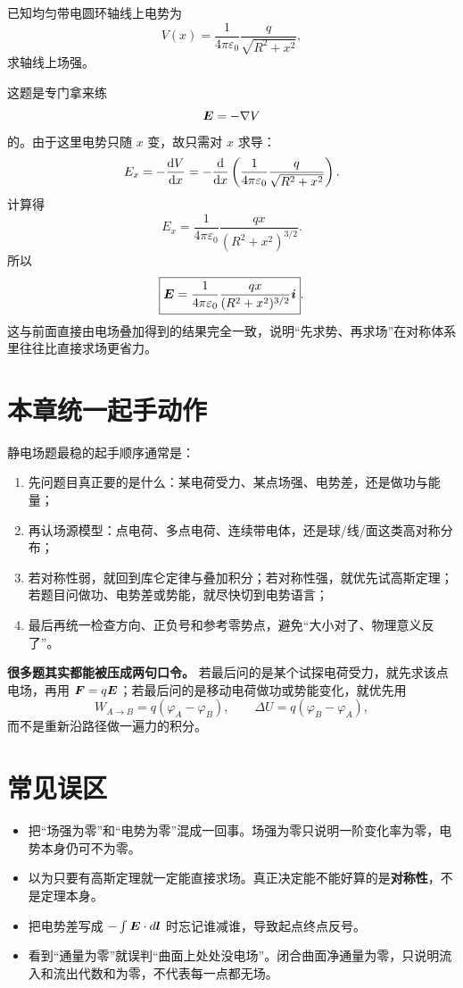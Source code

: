 \documentclass[lang=cn,11pt]{elegantbook}
\begin{document}
\begin{example}[由电势反推圆环轴线上的场强]
已知均匀带电圆环轴线上电势为
\[
V(x)=\frac{1}{4\pi\varepsilon_0}\frac{q}{\sqrt{R^2+x^2}},
\]
求轴线上场强。
\end{example}

\begin{solution}
这题是专门拿来练
\[
\vb*{E}=-\nabla V
\]
的。由于这里电势只随 \(x\) 变，故只需对 \(x\) 求导：
\[
E_x=-\dv{V}{x}
=-\dv{}{x}\left(
\frac{1}{4\pi\varepsilon_0}\frac{q}{\sqrt{R^2+x^2}}
\right).
\]
计算得
\[
E_x=
\frac{1}{4\pi\varepsilon_0}
\frac{qx}{(R^2+x^2)^{3/2}}.
\]
所以
\[
\boxed{
\vb*{E}=
\frac{1}{4\pi\varepsilon_0}
\frac{qx}{(R^2+x^2)^{3/2}}\vb*{i}
}.
\]
这与前面直接由电场叠加得到的结果完全一致，说明“先求势、再求场”在对称体系里往往比直接求场更省力。
\end{solution}

\section{本章统一起手动作}

静电场题最稳的起手顺序通常是：
\begin{enumerate}
  \item 先问题目真正要的是什么：某电荷受力、某点场强、电势差，还是做功与能量；
  \item 再认场源模型：点电荷、多点电荷、连续带电体，还是球/线/面这类高对称分布；
  \item 若对称性弱，就回到库仑定律与叠加积分；若对称性强，就优先试高斯定理；若题目问做功、电势差或势能，就尽快切到电势语言；
  \item 最后再统一检查方向、正负号和参考零势点，避免“大小对了、物理意义反了”。
\end{enumerate}

\begin{note}
\textbf{很多题其实都能被压成两句口令。} 若最后问的是某个试探电荷受力，就先求该点电场，再用 \(\vb*{F}=q\vb*{E}\)；若最后问的是移动电荷做功或势能变化，就优先用
\[
W_{A\to B}=q(\varphi_A-\varphi_B),
\qquad
\Delta U=q(\varphi_B-\varphi_A),
\]
而不是重新沿路径做一遍力的积分。
\end{note}

\section{常见误区}

\begin{itemize}
  \item 把“场强为零”和“电势为零”混成一回事。场强为零只说明一阶变化率为零，电势本身仍可不为零。
  \item 以为只要有高斯定理就一定能直接求场。真正决定能不能好算的是\textbf{对称性}，不是定理本身。
  \item 把电势差写成 \(-\int \vb*{E}\cdot d\vb*{l}\) 时忘记谁减谁，导致起点终点反号。
  \item 看到“通量为零”就误判“曲面上处处没电场”。闭合曲面净通量为零，只说明流入和流出代数和为零，不代表每一点都无场。
\end{itemize}
\end{document}
